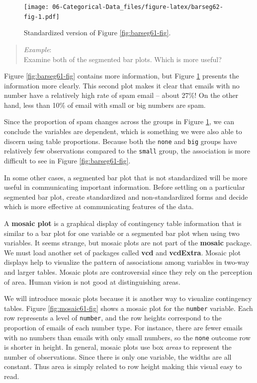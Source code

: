 \documentclass[
]{book}
\begin{document}
\begin{figure}
\centering
\texttt{[image: 06-Categorical-Data\_files/figure-latex/barseg62-fig-1.pdf]}
\caption{\label{fig:barseg62-fig}Standardized version of Figure \ref{fig:barseg61-fig}.}
\end{figure}

\begin{quote}
\emph{Example}:\\
Examine both of the segmented bar plots. Which is more useful?
\end{quote}

Figure \ref{fig:barseg61-fig} contains more information, but Figure \ref{fig:barseg62-fig} presents the information more clearly. This second plot makes it clear that emails with no number have a relatively high rate of spam email -- about 27\%! On the other hand, less than 10\% of email with small or big numbers are spam.

Since the proportion of spam changes across the groups in Figure \ref{fig:barseg62-fig}, we can conclude the variables are dependent, which is something we were also able to discern using table proportions. Because both the \texttt{none} and \texttt{big} groups have relatively few observations compared to the \texttt{small} group, the association is more difficult to see in Figure \ref{fig:barseg61-fig}.

In some other cases, a segmented bar plot that is not standardized will be more useful in communicating important information. Before settling on a particular segmented bar plot, create standardized and non-standardized forms and decide which is more effective at communicating features of the data.

A \textbf{mosaic plot} is a graphical display of contingency table information that is similar to a bar plot for one variable or a segmented bar plot when using two variables. It seems strange, but mosaic plots are not part of the \textbf{mosaic} package. We must load another set of packages called \textbf{vcd} and \textbf{vcdExtra}. Mosaic plot displays help to visualize the pattern of associations among variables in two-way and larger tables. Mosaic plots are controversial since they rely on the perception of area. Human vision is not good at distinguishing areas.

We will introduce mosaic plots because it is another way to visualize contingency tables. Figure \ref{fig:mosaic61-fig} shows a mosaic plot for the \texttt{number} variable. Each row represents a level of \texttt{number}, and the row heights correspond to the proportion of emails of each number type. For instance, there are fewer emails with no numbers than emails with only small numbers, so the \texttt{none} outcome row is shorter in height. In general, mosaic plots use box \emph{areas} to represent the number of observations. Since there is only one variable, the widths are all constant. Thus area is simply related to row height making this visual easy to read.
\end{document}
